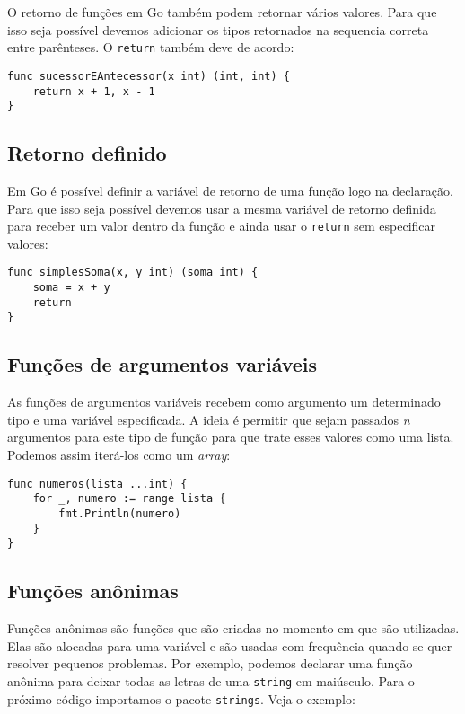 \documentclass{SBCbookchapter}
\begin{document}
O retorno de funções em Go também podem retornar vários valores. Para que isso seja possível devemos adicionar os tipos retornados na sequencia correta entre parênteses. O \texttt{return} também deve de acordo:

\begin{lstlisting}
func sucessorEAntecessor(x int) (int, int) {
	return x + 1, x - 1
}
\end{lstlisting}

\subsection{Retorno definido}

Em Go é possível definir a variável de retorno de uma função logo na declaração. Para que isso seja possível devemos usar a mesma variável de retorno definida para receber um valor dentro da função e ainda usar o \texttt{return} sem especificar valores:

\begin{lstlisting}
func simplesSoma(x, y int) (soma int) {
	soma = x + y
	return
}
\end{lstlisting}

\subsection{Funções de argumentos variáveis}

As funções de argumentos variáveis recebem como argumento um determinado tipo e uma variável especificada. A ideia é permitir que sejam passados \textit{n} argumentos para este tipo de função para que trate esses valores como uma lista. Podemos assim iterá-los como um \textit{array}:

\begin{lstlisting}
func numeros(lista ...int) {
	for _, numero := range lista {
		fmt.Println(numero)
	}
}
\end{lstlisting}

\subsection{Funções anônimas}

Funções anônimas são funções que são criadas no momento em que são utilizadas. Elas são alocadas para uma variável e são usadas com frequência quando se quer resolver pequenos problemas. Por exemplo, podemos declarar uma função anônima para deixar todas as letras de uma \texttt{string} em maiúsculo. Para o próximo código importamos o pacote \texttt{strings}. Veja o exemplo:
\end{document}
